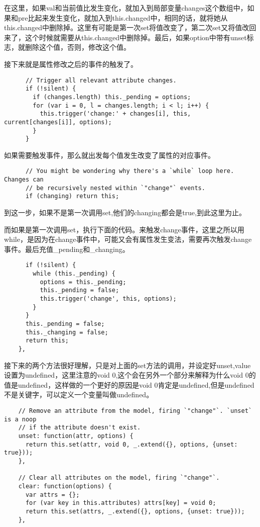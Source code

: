   在这里，如果val和当前值比发生变化，就加入到局部变量changes这个数组中，如果和pre比起来发生变化，就加入到this.changed中，相同的话，就将她从this.changed中删除掉。这里有可能是第一次set将值改变了，第二次set又将值改回来了，这个时候就需要从this.changed中删除掉。最后，如果option中带有unset标志，就删除这个值，否则，修改这个值。

  接下来就是属性修改之后的事件的触发了。
 
  \begin{lstlisting}
      // Trigger all relevant attribute changes.
      if (!silent) {
        if (changes.length) this._pending = options;
        for (var i = 0, l = changes.length; i < l; i++) {
          this.trigger('change:' + changes[i], this, current[changes[i]], options);
        }
      }
  \end{lstlisting}
  如果需要触发事件，那么就出发每个值发生改变了属性的对应事件。
  \begin{lstlisting}
      // You might be wondering why there's a `while` loop here. Changes can
      // be recursively nested within `"change"` events.
      if (changing) return this;
  \end{lstlisting}
  到这一步，如果不是第一次调用set,他们的changing都会是true,到此这里为止。

  而如果是第一次调用set，执行下面的代码。来触发change事件，这里之所以用while，是因为在change事件中，可能又会有属性发生变法，需要再次触发change事件。最后充值\_pending和\_changing。
  \begin{lstlisting}
      if (!silent) {
        while (this._pending) {
          options = this._pending;
          this._pending = false;
          this.trigger('change', this, options);
        }
      }
      this._pending = false;
      this._changing = false;
      return this;
    },

  \end{lstlisting}

  接下来的两个方法很好理解，只是对上面的set方法的调用，并设定好unset,value设置为undefined，这里注意的void 0,这个会在另外一个部分来解释为什么void 0的值是undefined，这样做的一个更好的原因是void 0肯定是undefined,但是undefined不是关键字，可以定义一个变量叫做undefined。

  \begin{lstlisting}
    // Remove an attribute from the model, firing `"change"`. `unset` is a noop
    // if the attribute doesn't exist.
    unset: function(attr, options) {
      return this.set(attr, void 0, _.extend({}, options, {unset: true}));
    },

    // Clear all attributes on the model, firing `"change"`.
    clear: function(options) {
      var attrs = {};
      for (var key in this.attributes) attrs[key] = void 0;
      return this.set(attrs, _.extend({}, options, {unset: true}));
    },

  \end{lstlisting}

